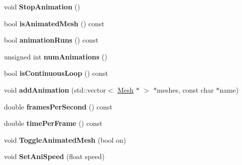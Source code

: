 \begin{DoxyCompactItemize}
\item 
void {\bfseries Stop\+Animation} ()\hypertarget{classMeshAnimation_a1c9a422813f07019027e67e2cf0dec1e}{}\label{classMeshAnimation_a1c9a422813f07019027e67e2cf0dec1e}

\item 
bool {\bfseries is\+Animated\+Mesh} () const \hypertarget{classMeshAnimation_ac1ff349498b5752c6fd59f449ea52b08}{}\label{classMeshAnimation_ac1ff349498b5752c6fd59f449ea52b08}

\item 
bool {\bfseries animation\+Runs} () const \hypertarget{classMeshAnimation_a7841c4c0adb9620b66f496eebc03183f}{}\label{classMeshAnimation_a7841c4c0adb9620b66f496eebc03183f}

\item 
unsigned int {\bfseries num\+Animations} ()\hypertarget{classMeshAnimation_a71acdec19bdf52be1ecc1ad74a872469}{}\label{classMeshAnimation_a71acdec19bdf52be1ecc1ad74a872469}

\item 
bool {\bfseries is\+Continuous\+Loop} () const \hypertarget{classMeshAnimation_aff687f32d3c4eff27711d0387dbff66f}{}\label{classMeshAnimation_aff687f32d3c4eff27711d0387dbff66f}

\item 
void {\bfseries add\+Animation} (std\+::vector$<$ \hyperlink{classMesh}{Mesh} $\ast$ $>$ $\ast$meshes, const char $\ast$name)\hypertarget{classMeshAnimation_affc51d5f42663b03ddb7561bfde5a45b}{}\label{classMeshAnimation_affc51d5f42663b03ddb7561bfde5a45b}

\item 
double {\bfseries frames\+Per\+Second} () const \hypertarget{classMeshAnimation_aba38d809319d9a3622a8e59988f98f55}{}\label{classMeshAnimation_aba38d809319d9a3622a8e59988f98f55}

\item 
double {\bfseries time\+Per\+Frame} () const \hypertarget{classMeshAnimation_acb4d6a8706498056b373231c91fcd0a5}{}\label{classMeshAnimation_acb4d6a8706498056b373231c91fcd0a5}

\item 
void {\bfseries Toggle\+Animated\+Mesh} (bool on)\hypertarget{classMeshAnimation_a1018e7dcdbc3e838c9f218f442f6e772}{}\label{classMeshAnimation_a1018e7dcdbc3e838c9f218f442f6e772}

\item 
void {\bfseries Set\+Ani\+Speed} (float speed)\hypertarget{classMeshAnimation_a9928384425b66db7c4116da4997b2f45}{}\label{classMeshAnimation_a9928384425b66db7c4116da4997b2f45}

\end{DoxyCompactItemize}
